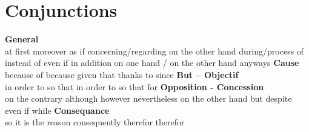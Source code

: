 \section{Conjunctions}
  {\sffamily\bfseries General}\\
     {at first}
    {moreover}
    {as if}
     {concerning/regarding}
     {on the other hand}
     {during/process of}
     {instead of}
     {even if}
     {in addition}
     {on one hand / on the other hand}
     {anyways}
{\sffamily\bfseries Cause}\\
   {because of}
   {because}
   {given that}
   {thanks to}
   {since}
{\sffamily\bfseries But -- Objectif}\\
   {in order to}
   {so that}
   {in order to}
   {so that}
   {for}
{\sffamily\bfseries Opposition - Concession}\\
   {on the contrary}
   {although}
   {however}
   {nevertheless}
   {on the other hand}
   {but}
   {despite}
   {even if}
   {while}
{\sffamily\bfseries Consequance}\\
   {so}
   {it is the reason}
   {}
   {consequently}
   {therefor}
   {therefor}
